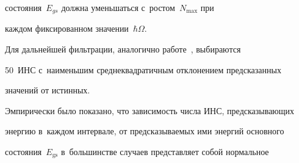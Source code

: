 




\noindent


 со\-сто\-яния~$E_{gs}$ долж\-на уменьшаться с~рос\-том~$N_{\max}$ при 


каж\-дом фиксированном значении~$\hbar\Omega$. 


  


  Для дальнейшей фильтрации, аналогично работе~\cite{13-b}, выбираются 


50~ИНС с~наименьшим сред\-не\-квад\-ра\-тич\-ным отклонением предсказанных 


значений от истинных.








  


  Эмпирически было показано, что за\-ви\-си\-мость чис\-ла ИНС, пред\-ска\-зы\-ва\-ющих 


энергию в~каждом интервале, от пред\-ска\-зы\-ва\-емых ими энергий основного 


со\-сто\-яния~$E_{\mathrm{gs}}$ в~большинстве случаев пред\-став\-ля\-ет собой нормальное 


